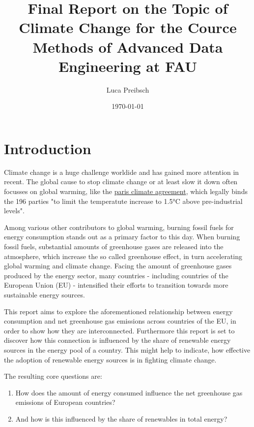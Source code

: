 \documentclass{article}
\begin{document}
\title{Final Report on the Topic of Climate Change
for the Cource Methods of Advanced Data Engineering at FAU}
\author{Luca Preibsch}
\date{\today}


\maketitle
\section*{Introduction}

Climate change is a huge challenge worldide and has gained more attention in recent.
The global cause to stop climate change or at least slow it down often focusses on global warming, like the
\href{https://unfccc.int/process-and-meetings/the-paris-agreement}{paris climate agreement},
which legally binds the 196 parties "to limit the temperatute increase to 1.5°C above pre-industrial levels".

Among various other contributors to global warming, burning fossil fuels for energy consumption stands out as
a primary factor to this day.
When burning fossil fuels, substantial amounts of greenhouse gases are released into the atmosphere,
which increase the so called greenhouse effect, in turn accelerating global warming and climate change.
Facing the amount of greenhouse gases produced by the energy sector, many countries - including countries of
the European Union (EU) - intensified their efforts to transition towards more sustainable energy sources.

This report aims to explore the aforementioned relationship between energy consumption and net greenhouse gas
emissions across countries of the EU, in order to show how they are interconnected.
Furthermore this report is set to discover how this connection is influenced by the share of renewable energy sources
in the energy pool of a country. This might help to indicate, how effective the adoption of renewable energy sources is
in fighting climate change.

The resulting core questions are:
\begin{enumerate}
    \item How does the amount of energy consumed influence the net greenhouse gas emissions of European countries?
    \item And how is this influenced by the share of renewables in total energy?
\end{enumerate}
\end{document}
